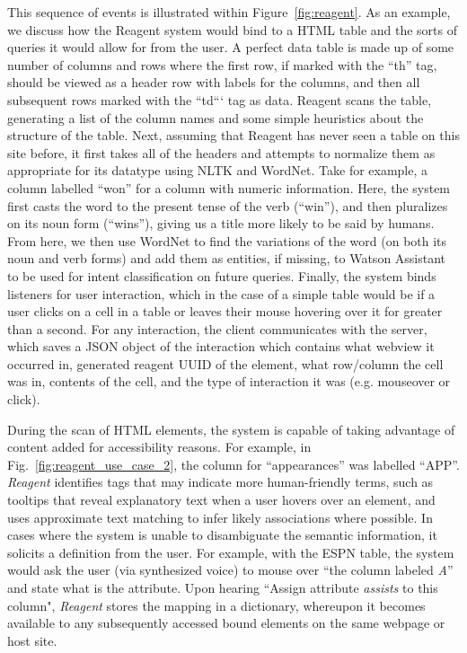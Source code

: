 This sequence of events is illustrated within Figure~\ref{fig:reagent}. As an example, we discuss how the
Reagent system would bind to a HTML table and the sorts of queries it would allow for from the user. A perfect data table
is made up of some number of columns and rows where the first row, if marked with the ``th'' tag, should be viewed
as a header row with labels for the columns, and then all subsequent rows marked with the ``td``` tag as data. Reagent
scans the table, generating a list of the column names and some simple heuristics about the structure of the table. Next,
assuming that Reagent has never seen a table on this site before, it first takes all of the headers and attempts to
normalize them as appropriate for its datatype using NLTK and WordNet. Take for example, a column labelled ``won''
for a column with numeric information. Here, the system first casts the word to the present tense of the verb (``win''),
and then pluralizes on its noun form (``wins''), giving us a title more likely to be said by humans. From here, we then
use WordNet to find the variations of the word (on both its noun and verb forms) and add them as entities, if missing,
to Watson Assistant to be used for intent classification on future queries.
Finally, the system binds listeners for user interaction, which in the case of a simple table would be if a user clicks on
a cell in a table or leaves their mouse hovering over it for greater than a second. For any interaction, the client
communicates with the server, which saves a JSON object of the interaction which contains what webview it occurred in,
generated reagent UUID of the element, what row/column the cell was in, contents of the cell, and the type of interaction
it was (e.g. mouseover or click).

During the scan of HTML elements, the system is capable of taking advantage of
content added for accessibility reasons. For example, in
Fig.~\ref{fig:reagent_use_case_2}, the column for ``appearances'' was labelled ``APP''.
\textit{Reagent} identifies tags that may indicate more human-friendly terms,
such as tooltips that reveal explanatory text when a user hovers over an
element, and uses approximate text matching to infer likely associations where
possible.
In cases where the system is unable to disambiguate the semantic information, it
solicits a definition from the user. For example, with the ESPN table, the
system would ask the user (via synthesized voice) to mouse over ``the column
labeled  \textit{A}'' and state what is the attribute. Upon hearing ``Assign
attribute \textit{assists} to this column", \textit{Reagent} stores the
mapping in a dictionary, whereupon it becomes available to any subsequently
accessed bound elements on the same webpage or host site.

